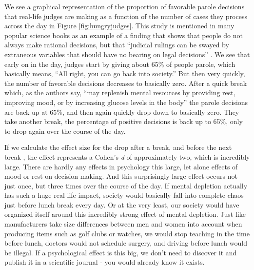 \documentclass[
  oneside]{krantz}
\begin{document}
We see a graphical representation of the proportion of favorable parole decisions that real-life judges are making as a function of the number of cases they process across the day in Figure \ref{fig:hungryjudges}. This study is mentioned in many popular science books as an example of a finding that shows that people do not always make rational decisions, but that ``judicial rulings can be swayed by extraneous variables that should have no bearing on legal decisions'' \citep{danziger_extraneous_2011}. We see that early on in the day, judges start by giving about 65\% of people parole, which basically means, ``All right, you can go back into society.'' But then very quickly, the number of favorable decisions decreases to basically zero. After a quick break which, as the authors say, ``may replenish mental resources by providing rest, improving mood, or by increasing glucose levels in the body'' the parole decisions are back up at 65\%, and then again quickly drop down to basically zero. They take another break, the percentage of positive decisions is back up to 65\%, only to drop again over the course of the day.

If we calculate the effect size for the drop after a break, and before the next break \citep{glockner_irrational_2016}, the effect represents a Cohen's \emph{d} of approximately two, which is incredibly large. There are hardly any effects in psychology this large, let alone effects of mood or rest on decision making. And this surprisingly large effect occurs not just once, but three times over the course of the day. If mental depletion actually has such a huge real-life impact, society would basically fall into complete chaos just before lunch break every day. Or at the very least, our society would have organized itself around this incredibly strong effect of mental depletion. Just like manufacturers take size differences between men and women into account when producing items such as golf clubs or watches, we would stop teaching in the time before lunch, doctors would not schedule surgery, and driving before lunch would be illegal. If a psychological effect is this big, we don't need to discover it and publish it in a scientific journal - you would already know it exists.
\end{document}
